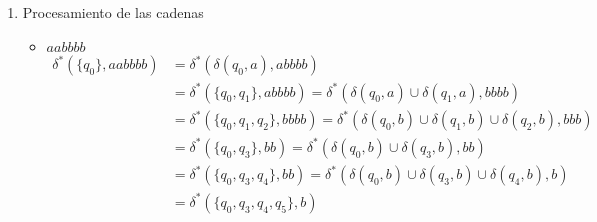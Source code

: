 \documentclass{article}
\begin{document}
\begin{enumerate}
{\begin{itemize}
\begin{enumerate}
{\begin{figure} [H]
                            \caption{$M$ que reconoce a $L$}
                        \end{figure}
                    }
                    \item {
                        Procesamiento de las cadenas
                        \begin{itemize}
                            \item {
                                $aabbbb$
                                \begin{align*}
                                    \delta^{*}(\{q_{0}\}, aabbbb) 
                                    &= \delta^{*}(\delta(q_{0}, a), abbbb) \\
                                    &= \delta^{*}(\{q_{0}, q_{1}\}, abbbb) 
                                    = \delta^{*}(\delta(q_{0}, a) 
                                    \cup \delta(q_{1}, a), bbbb) \\
                                    &= \delta^{*}(\{q_{0}, q_{1}, q_{2}\}, bbbb)
                                    = \delta^{*}(\delta(q_{0}, b) 
                                    \cup \delta(q_{1}, b) 
                                    \cup \delta(q_{2}, b), bbb) \\
                                    &= \delta^{*}(\{q_{0}, q_{3}\}, bb)
                                    = \delta^{*}(\delta(q_{0}, b) 
                                    \cup \delta(q_{3}, b), bb) \\
                                    &= \delta^{*}(\{q_{0}, q_{3}, q_{4}\}, bb)
                                    = \delta^{*}(\delta(q_{0}, b) 
                                    \cup \delta(q_{3}, b) 
                                    \cup \delta(q_{4}, b), b) \\
                                    &= \delta^{*}(\{q_{0}, q_{3}, q_{4}, q_{5}\}, b)

\end{align*}}
\end{itemize}}
\end{enumerate}
\end{itemize}}
\end{enumerate}
\end{document}
